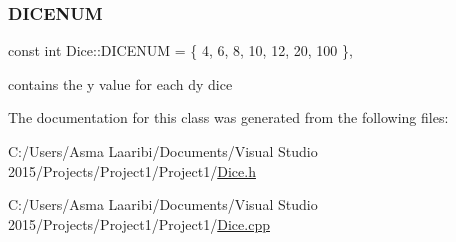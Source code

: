 \subsubsection{\texorpdfstring{D\+I\+C\+E\+N\+UM}{DICENUM}}
{\footnotesize\ttfamily const int Dice\+::\+D\+I\+C\+E\+N\+UM = \{ 4, 6, 8, 10, 12, 20, 100 \}\hspace{0.3cm}{\ttfamily [static]}, {\ttfamily [private]}}

contains the y value for each dy dice 

The documentation for this class was generated from the following files\+:\begin{DoxyCompactItemize}
\item 
C\+:/\+Users/\+Asma Laaribi/\+Documents/\+Visual Studio 2015/\+Projects/\+Project1/\+Project1/\hyperlink{_dice_8h}{Dice.\+h}\item 
C\+:/\+Users/\+Asma Laaribi/\+Documents/\+Visual Studio 2015/\+Projects/\+Project1/\+Project1/\hyperlink{_dice_8cpp}{Dice.\+cpp}\end{DoxyCompactItemize}

